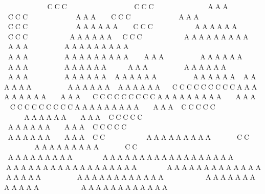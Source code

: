               


CCC                          


CCC                          AAA


CCC                       AAA


CCC                       AAA


CCC                       AAAAAA


CCC                    AAAAAA


CCC                    AAAAAA


CCC                    AAAAAAAAA


AAA                 AAAAAAAAA


AAA                 AAAAAAAAA


AAA                 AAAAAA   


AAA                 AAAAAA   


AAA                 AAAAAA   


AAA                 AAAAAA   AAAAAA                 AAAAAA   AAAAAA                 AAAAAA   AAAAAA     CCCCCCCCCAAAAAAAAA      AAA     CCCCCCCCCAAAAAAAAA      AAA     CCCCCCCCCAAAAAAAAA      AAA   CCCCC








AAAAAA      AAA   CCCCC








AAAAAA      AAA   CCCCC








AAAAAA      AAA   CC








AAAAAAAAA            CC








AAAAAAAAA            CC








AAAAAAAAA              AAAAAAAAAAAAAAAAAA              AAAAAAAAAAAAAAAAAA              AAAAAAAAAAAAAAAAAA                 AAAAAAAAAAAA                    AAAAAAAAAAAA                    AAAAAAAAAAAA               
